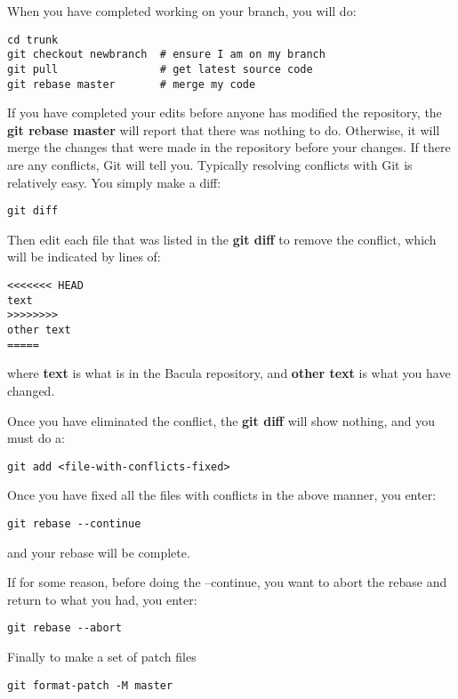 When you have completed working on your branch, you will do:

\begin{verbatim}
cd trunk
git checkout newbranch  # ensure I am on my branch
git pull                # get latest source code
git rebase master       # merge my code
\end{verbatim}

If you have completed your edits before anyone has modified the repository,
the {\bf git rebase master} will report that there was nothing to do. Otherwise,
it will merge the changes that were made in the repository before your changes.
If there are any conflicts, Git will tell you. Typically resolving conflicts with
Git is relatively easy.  You simply make a diff:

\begin{verbatim}
git diff
\end{verbatim}

Then edit each file that was listed in the {\bf git diff} to remove the
conflict, which will be indicated by lines of:

\begin{verbatim}
<<<<<<< HEAD
text
>>>>>>>>
other text
=====
\end{verbatim}

where {\bf text} is what is in the Bacula repository, and {\bf other text}
is what you have changed.

Once you have eliminated the conflict, the {\bf git diff} will show nothing,
and you must do a:

\begin{verbatim}
git add <file-with-conflicts-fixed>
\end{verbatim}

Once you have fixed all the files with conflicts in the above manner, you enter:

\begin{verbatim}
git rebase --continue
\end{verbatim}

and your rebase will be complete.

If for some reason, before doing the --continue, you want to abort the rebase and return to what you had, you enter:

\begin{verbatim}
git rebase --abort
\end{verbatim}

Finally to make a set of patch files

\begin{verbatim}
git format-patch -M master
\end{verbatim}

